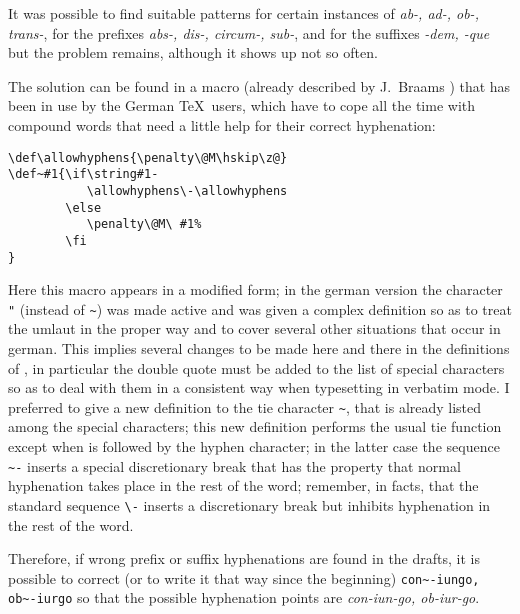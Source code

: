 It was possible to find suitable patterns for certain instances of {\it ab-,
ad-, ob-, trans-}, for the prefixes {\it abs-, dis-, circum-, sub-}, and for
the  suffixes {\it -dem, -que} but the problem remains, although it shows up
not so often.

The  solution  can  be  found  in  a  macro  (already described by J.~Braams
\cite{braams}) that has been in use by the German \TeX\ users, which have to
cope  all  the  time  with  compound words that need a little help for their
correct hyphenation:
 \begin{verbatim}
\def\allowhyphens{\penalty\@M\hskip\z@}
\def~#1{\if\string#1-
           \allowhyphens\-\allowhyphens
        \else
           \penalty\@M\ #1%
        \fi
}
\end{verbatim}

Here  this  macro  appears  in  a  modified  form; in the german version the
character \verb|"| (instead of \verb|~|) was made active  and  was  given  a
complex  definition so as to treat the umlaut in the proper way and to cover
several other situations that occur in german. This implies several  changes
to  be  made  here and there in the definitions of \plain, in particular the
double quote must be added to the list of special characters so as  to  deal
with them in a consistent way when typesetting in verbatim mode. I preferred
to give a new definition to the tie  character  \verb|~|,  that  is  already
listed  among the special characters; this new definition performs the usual
tie function except when is followed by the hyphen character; in the  latter
case  the  sequence \verb|~-| inserts a special discretionary break that has
the property that normal hyphenation takes place in the rest  of  the  word;
remember,   in  facts,  that  the  standard  sequence  \verb|\-|  inserts  a
discretionary break but inhibits hyphenation in the rest of the word.

Therefore,  if  wrong prefix or suffix hyphenations are found in the drafts,
it is possible to correct (or to write it  that  way  since  the  beginning)
\verb|con~-iungo,  ob~-iurgo|  so  that  the possible hyphenation points are
{\it con-iun-go, ob-iur-go}.


